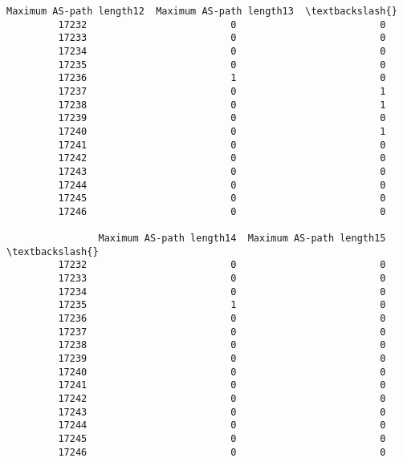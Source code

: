 \documentclass[11pt]{article}
\begin{document}
\begin{Verbatim}[commandchars=\\\{\}]
                Maximum AS-path length12  Maximum AS-path length13  \textbackslash{}
         17232                         0                         0   
         17233                         0                         0   
         17234                         0                         0   
         17235                         0                         0   
         17236                         1                         0   
         17237                         0                         1   
         17238                         0                         1   
         17239                         0                         0   
         17240                         0                         1   
         17241                         0                         0   
         17242                         0                         0   
         17243                         0                         0   
         17244                         0                         0   
         17245                         0                         0   
         17246                         0                         0   
         
                Maximum AS-path length14  Maximum AS-path length15  \textbackslash{}
         17232                         0                         0   
         17233                         0                         0   
         17234                         0                         0   
         17235                         1                         0   
         17236                         0                         0   
         17237                         0                         0   
         17238                         0                         0   
         17239                         0                         0   
         17240                         0                         0   
         17241                         0                         0   
         17242                         0                         0   
         17243                         0                         0   
         17244                         0                         0   
         17245                         0                         0   
         17246                         0                         0   
         

\end{Verbatim}
\end{document}
